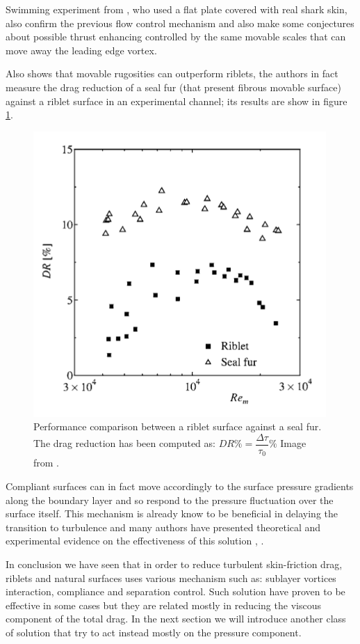 Swimming experiment from \citet{Oeffner785}, who used a flat plate covered with real shark skin, also confirm the previous flow control mechanism and also make some conjectures about possible thrust enhancing controlled by the same movable scales that can move away the leading edge vortex.

Also \citet{itoh2006turbulent} shows that movable rugosities can outperform riblets, the authors in fact measure the drag reduction of a seal fur (that present fibrous movable surface) against a riblet surface in an experimental channel; its results are show in figure \ref{fig:seal}.

\begin{figure}[h]
\centering
\includegraphics[width=0.5\linewidth]{chapter_1/seal}
\caption{Performance comparison between a riblet surface against a seal fur. The drag reduction has been computed as: $DR \% = \dfrac{ \Delta \tau}{\tau_{0}} \%$ Image from \citet{itoh2006turbulent}.}
\label{fig:seal}
\end{figure}


Compliant surfaces can in fact move accordingly to the surface pressure gradients along the boundary layer and so respond to the pressure fluctuation over the surface itself.
This mechanism is already know to be beneficial in delaying the transition to turbulence and many authors have presented theoretical and experimental evidence on the effectiveness of this solution \citet{carpenter1990status}, \citet{bushnell1977effect}.

In conclusion we have seen that in order to reduce turbulent skin-friction drag, riblets and natural surfaces uses various mechanism such as: sublayer vortices interaction, compliance and separation control.
Such solution have proven to be effective in some cases but they are related mostly in reducing the viscous component of the total drag.
In the next section we will introduce another class of solution that try to act instead mostly on the pressure component.


